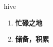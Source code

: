 
\begin{frame}
{\huge hive}
\begin{center}
\begin{enumerate}\Large
  \item \textbf{忙碌之地}
  \item \textbf{储备，积累}
\end{enumerate}
\end{center}
\end{frame}
